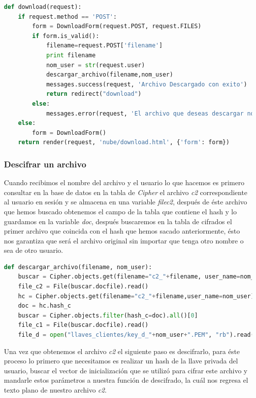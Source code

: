 \begin{lstlisting}[language=Python,frame=single, keywordstyle=\color{blue},breaklines=true, showstringspaces=false]
def download(request):
    if request.method == 'POST':
        form = DownloadForm(request.POST, request.FILES)
        if form.is_valid():
            filename=request.POST['filename']
            print filename
            nom_user = str(request.user)
            descargar_archivo(filename,nom_user)
            messages.success(request, 'Archivo Descargado con exito')
            return redirect("download")
        else:
            messages.error(request, 'El archivo que deseas descargar no existe')
    else:
        form = DownloadForm()
    return render(request, 'nube/download.html', {'form': form})
\end{lstlisting}

\subsubsection{Descifrar un archivo}

Cuando recibimos el nombre del archivo y el usuario lo que hacemos es primero consultar en la base de datos en la tabla de \textit{Cipher} el archivo \textit{c2} correspondiente al usuario en sesión y se almacena en una variable \textit{filec2}, después de éste archivo que hemos buscado obtenemos el campo de la tabla que contiene el hash y lo guardamos en la variable \textit{doc}, después buscaremos en la tabla de cifrados el primer archivo que coincida con el hash que hemos sacado anteriormente, ésto nos garantiza que será el archivo original sin importar que tenga otro nombre o sea de otro usuario.

\begin{lstlisting}[language=Python,frame=single, keywordstyle=\color{blue},breaklines=true, showstringspaces=false]
def descargar_archivo(filename, nom_user):
    buscar = Cipher.objects.get(filename="c2_"+filename, user_name=nom_user)
    file_c2 = File(buscar.docfile).read()
    hc = Cipher.objects.get(filename="c2_"+filename,user_name=nom_user)
    doc = hc.hash_c
    buscar = Cipher.objects.filter(hash_c=doc).all()[0]
    file_c1 = File(buscar.docfile).read()
    file_d = open("llaves_clientes/key_d_"+nom_user+".PEM", "rb").read()
\end{lstlisting}

Una vez que obtenemos el archivo \textit{c2} el siguiente paso es descifrarlo, para éste proceso lo primero que necesitamos es realizar un hash de la llave privada del usuario, buscar el vector de inicialización que se utilizó para cifrar este archivo y mandarle estos parámetros a nuestra función de descifrado, la cuál nos regresa el texto plano de nuestro archivo \textit{c2}.

